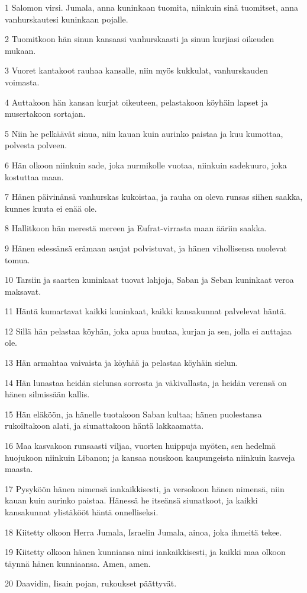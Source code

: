 \par 1 Salomon virsi. Jumala, anna kuninkaan tuomita, niinkuin sinä tuomitset, anna vanhurskautesi kuninkaan pojalle.
\par 2 Tuomitkoon hän sinun kansaasi vanhurskaasti ja sinun kurjiasi oikeuden mukaan.
\par 3 Vuoret kantakoot rauhaa kansalle, niin myös kukkulat, vanhurskauden voimasta.
\par 4 Auttakoon hän kansan kurjat oikeuteen, pelastakoon köyhäin lapset ja musertakoon sortajan.
\par 5 Niin he pelkäävät sinua, niin kauan kuin aurinko paistaa ja kuu kumottaa, polvesta polveen.
\par 6 Hän olkoon niinkuin sade, joka nurmikolle vuotaa, niinkuin sadekuuro, joka kostuttaa maan.
\par 7 Hänen päivinänsä vanhurskas kukoistaa, ja rauha on oleva runsas siihen saakka, kunnes kuuta ei enää ole.
\par 8 Hallitkoon hän merestä mereen ja Eufrat-virrasta maan ääriin saakka.
\par 9 Hänen edessänsä erämaan asujat polvistuvat, ja hänen vihollisensa nuolevat tomua.
\par 10 Tarsiin ja saarten kuninkaat tuovat lahjoja, Saban ja Seban kuninkaat veroa maksavat.
\par 11 Häntä kumartavat kaikki kuninkaat, kaikki kansakunnat palvelevat häntä.
\par 12 Sillä hän pelastaa köyhän, joka apua huutaa, kurjan ja sen, jolla ei auttajaa ole.
\par 13 Hän armahtaa vaivaista ja köyhää ja pelastaa köyhäin sielun.
\par 14 Hän lunastaa heidän sielunsa sorrosta ja väkivallasta, ja heidän verensä on hänen silmissään kallis.
\par 15 Hän eläköön, ja hänelle tuotakoon Saban kultaa; hänen puolestansa rukoiltakoon alati, ja siunattakoon häntä lakkaamatta.
\par 16 Maa kasvakoon runsaasti viljaa, vuorten huippuja myöten, sen hedelmä huojukoon niinkuin Libanon; ja kansaa nouskoon kaupungeista niinkuin kasveja maasta.
\par 17 Pysyköön hänen nimensä iankaikkisesti, ja versokoon hänen nimensä, niin kauan kuin aurinko paistaa. Hänessä he itseänsä siunatkoot, ja kaikki kansakunnat ylistäkööt häntä onnelliseksi.
\par 18 Kiitetty olkoon Herra Jumala, Israelin Jumala, ainoa, joka ihmeitä tekee.
\par 19 Kiitetty olkoon hänen kunniansa nimi iankaikkisesti, ja kaikki maa olkoon täynnä hänen kunniaansa. Amen, amen.
\par 20 Daavidin, Iisain pojan, rukoukset päättyvät.

